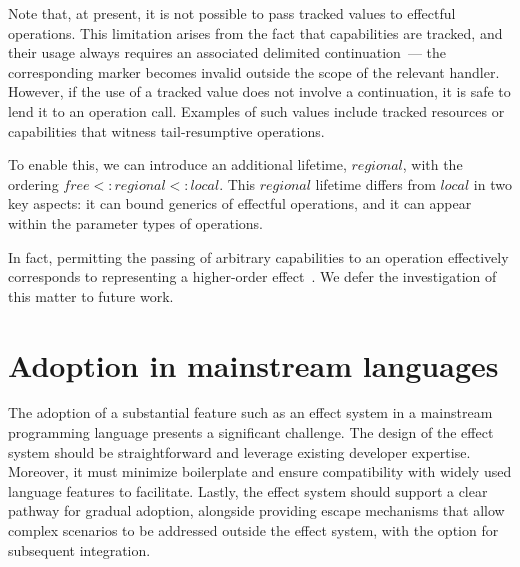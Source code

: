 \documentclass[acmsmall,review,screen]{acmart}
\begin{document}
Note that, at present, it is not possible to pass tracked values to effectful operations.
This limitation arises from the fact that capabilities are tracked, and their usage always requires an associated delimited continuation~--- the corresponding marker becomes invalid outside the scope of the relevant handler.
However, if the use of a tracked value does not involve a continuation, it is safe to lend it to an operation call.
Examples of such values include tracked resources or capabilities that witness tail-resumptive operations. %

To enable this, we can introduce an additional lifetime, $regional$, with the ordering $free <: regional <: local$.
This $regional$ lifetime differs from $local$ in two key aspects: it can bound generics of effectful operations, and it can appear within the parameter types of operations.

In fact, permitting the passing of arbitrary capabilities to an operation effectively corresponds to representing a higher-order effect~\cite{wu2014effect, zhang2020handling, van2022handling}.
We defer the investigation of this matter to future work.










\section{Adoption in mainstream languages} \label{sec:mainstream}

The adoption of a substantial feature such as an effect system in a mainstream programming language presents a significant challenge.
The design of the effect system should be straightforward and leverage existing developer expertise.
Moreover, it must minimize boilerplate and ensure compatibility with widely used language features to facilitate.
Lastly, the effect system should support a clear pathway for gradual adoption, alongside providing escape mechanisms that allow complex scenarios to be addressed outside the effect system, with the option for subsequent integration.
\end{document}
